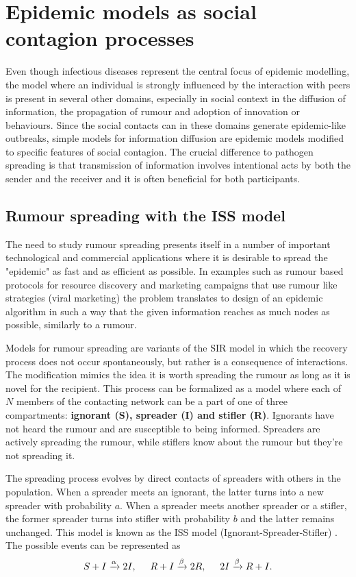 \documentclass[times, utf8, diplomski]{fer}
\begin{document}
\section{Epidemic models as social contagion processes}
Even though infectious diseases represent the central focus of epidemic modelling, the model where an individual is strongly influenced by the interaction with peers is present in several other domains, especially in social context in the diffusion of information, the propagation of rumour and adoption of innovation or behaviours.  Since the social contacts can in these domains generate epidemic-like outbreaks, simple models for information diffusion are epidemic models modified to specific features of social contagion. The crucial difference to pathogen spreading is that transmission of information involves intentional acts by both the sender and the receiver and it is often beneficial for both participants.

\subsection{Rumour spreading with the ISS model}
The need to study rumour spreading presents itself in a number of important technological and commercial applications where it is desirable to spread the "epidemic" as fast and as efficient as possible.  In examples such as rumour based protocols for resource discovery and marketing campaigns that use rumour like strategies (viral marketing)  the problem translates to design of an epidemic algorithm in such a way that the given information reaches as much nodes as possible, similarly to a rumour.

Models for rumour spreading are variants of the SIR model in which the recovery process does not occur spontaneously, but rather is a consequence of interactions. The modification mimics the idea it is worth spreading the rumour as long as it is novel for the recipient. This process can be formalized as a model where each of  $N$ members of the contacting network can be a part of one of three compartments: \textbf{ignorant (S), spreader (I) and stifler (R)}. Ignorants have not heard the rumour and are susceptible to being informed. Spreaders are actively spreading the rumour, while stiflers know about the rumour but they're not  spreading it.
 
The spreading process evolves by direct contacts of spreaders with others in the population. When a spreader meets an ignorant, the latter turns into a new spreader with probability $a$. When a spreader meets another spreader or a stifler, the former spreader turns into stifler with probability $b$ and the latter remains unchanged. This model is known as the ISS model (Ignorant-Spreader-Stifler) \cite{Moreno2004}. The possible events can be represented as 
\begin{equation*}
S + I \xrightarrow{\alpha} 2I,\hspace{5mm}  R + I \xrightarrow{\beta} 2R,  \hspace{5mm} 2I \xrightarrow{\beta} R + I.
\end{equation*}
\end{document}
